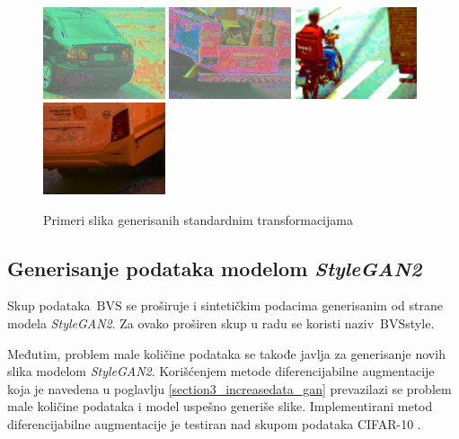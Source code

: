 \documentclass[12pt,oneside]{memoir}
\newcommand{\bvs}{\ensuremath{\,\textrm{BVS}}}
\begin{document}
\begin{figure}[!htbp]
  \includegraphics[width=0.32\textwidth]{matfmaster/glava4/basic_aug/6.jpg}
  \includegraphics[width=0.32\textwidth]{matfmaster/glava4/basic_aug/7.jpg}
  \includegraphics[width=0.32\textwidth]{matfmaster/glava4/basic_aug/8.jpg}
  \includegraphics[width=0.32\textwidth]{matfmaster/glava4/basic_aug/9.jpg}
\caption{Primeri slika generisanih standardnim transformacijama}\label{fig:basic_aug}
\end{figure}

 
\clearpage
\subsection{Generisanje podataka modelom \textit{StyleGAN2}}

Skup podataka \bvs{} se proširuje i sintetičkim podacima generisanim od strane modela \textit{StyleGAN2}. Za ovako proširen skup u radu se koristi naziv \bvs{style}. 

Međutim, problem male količine podataka se takođe javlja za generisanje novih slika modelom \textit{StyleGAN2}. Korišćenjem metode diferencijabilne augmentacije koja je navedena u poglavlju \ref{section3_increasedata_gan} prevazilazi se problem male količine podataka i model uspešno generiše slike. Implementirani metod diferencijabilne augmentacije je testiran nad skupom podataka CIFAR-10 \cite{2020diffaugment_report}.
\end{document}
